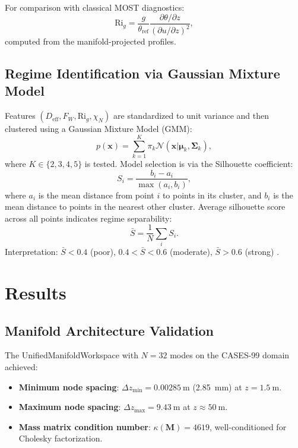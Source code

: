 \documentclass[11pt,a4paper]{article}
\begin{document}
For comparison with classical MOST diagnostics:
\begin{equation}
\mathrm{Ri}_g = \frac{g}{\theta_{\mathrm{ref}}} \frac{\partial \theta / \partial z}{(\partial u / \partial z)^2},
\label{eq:rif}
\end{equation}
computed from the manifold-projected profiles.

\subsection{Regime Identification via Gaussian Mixture Model}
\label{sec:methods:clustering}

Features $(D_{\mathrm{eff}}, F_W, \mathrm{Ri}_g, \chi_N)$ are standardized to unit variance and then clustered using a Gaussian Mixture Model (GMM):
\begin{equation}
p(\mathbf{x}) = \sum_{k=1}^{K} \pi_k \mathcal{N}(\mathbf{x} | \boldsymbol{\mu}_k, \boldsymbol{\Sigma}_k),
\end{equation}
where $K \in \{2, 3, 4, 5\}$ is tested. Model selection is via the Silhouette coefficient:
\begin{equation}
S_i = \frac{b_i - a_i}{\max(a_i, b_i)},
\end{equation}
where $a_i$ is the mean distance from point $i$ to points in its cluster, and $b_i$ is the mean distance to points in the nearest other cluster. Average silhouette score across all points indicates regime separability:
\begin{equation}
\bar{S} = \frac{1}{N} \sum_i S_i.
\end{equation}
Interpretation: $\bar{S} < 0.4$ (poor), $0.4 < \bar{S} < 0.6$ (moderate), $\bar{S} > 0.6$ (strong) \citep{Rousseeuw1987}.

\section{Results}
\label{sec:results}

\subsection{Manifold Architecture Validation}
\label{sec:results:manifold}

The UnifiedManifoldWorkspace with $N = 32$ modes on the CASES-99 domain achieved:
\begin{itemize}
  \item \textbf{Minimum node spacing}: $\Delta z_{\min} = \SI{0.00285}{\meter}$ (\SI{2.85}{\milli\meter}) at $z = \SI{1.5}{\meter}$.
  \item \textbf{Maximum node spacing}: $\Delta z_{\max} = \SI{9.43}{\meter}$ at $z \approx \SI{50}{\meter}$.
  \item \textbf{Mass matrix condition number}: $\kappa(\mathbf{M}) = 4619$, well-conditioned for Cholesky factorization.
\end{itemize}
\end{document}
